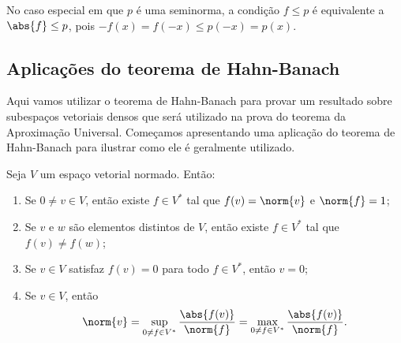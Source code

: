 No caso especial em que \( p \) é uma seminorma, a condição \( f \leq p \) é equivalente a \( \abs{ f } \leq p \), pois \( -f(x) = f(-x) \leq p(-x) = p(x) \).

\subsection{Aplicações do teorema de Hahn-Banach}

Aqui vamos utilizar o teorema de Hahn-Banach para provar um resultado sobre subespaços vetoriais densos que será utilizado na prova do teorema da Aproximação Universal.
Começamos apresentando uma aplicação do teorema de Hahn-Banach para ilustrar como ele é geralmente utilizado.

\begin{teo}
    Seja \( V \) um espaço vetorial normado.
    Então:
    \begin{enumerate}[label=\roman*)]
        \item Se \( 0 \neq v \in V \), então existe \( f \in V^{ * } \) tal que \( f(v) = \norm{ v } \) e \( \norm{ f } = 1 \);
        \item Se \( v \) e \( w \) são elementos distintos de \( V \), então existe \( f \in V^{ * } \) tal que \( f(v) \neq f(w) \);
        \item Se \( v \in V \) satisfaz \( f(v) = 0 \) para todo \( f \in V^{ * } \), então \( v = 0 \);
        \item Se \( v \in V \), então
        \begin{equation}
            \norm{ v }
            = \sup_{ 0 \neq f \in V^{ * } } \frac{ \abs{ f(v) } }{ \norm{ f } }
            = \max_{ 0 \neq f \in V^{ * } } \frac{ \abs{ f(v) } }{ \norm{ f } }
        .\end{equation}
    \end{enumerate}
\end{teo}
